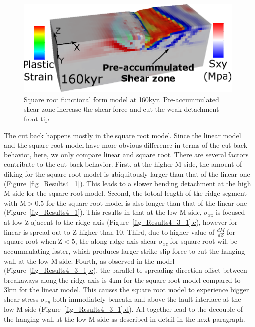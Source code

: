 \begin{figure}[hc]
  \centering
    \includegraphics[width=1.0\textwidth]{fig_Results4_5_sqrt_cut_back_pre_accummulated_shear_zone.eps}
  \caption{Square root functional form model at 160kyr. Pre-accummulated shear zone increase the shear force and cut the weak detachment front tip}
 \label{fig_Results4_5}
\end{figure}   

The cut back happens mostly in the square root model. Since the linear model and the square root model have more obvious difference in terms of the cut back behavior, here, we only compare linear and square root. There are several factors contribute to the cut back behavior. First, at the higher M side, the amount of diking for the square root model is ubiquitously larger than that of the linear one (Figure~\hyperref[fig_Results4_1]{\ref{fig_Results4_1}}). This leads to a slower bending detachment at the high M side for the square root model. Second, the totoal length of the ridge segment with M$>0.5$ for the square root model is also longer than that of the linear one (Figure~\hyperref[fig_Results4_1]{\ref{fig_Results4_1}}). This results in that at the low M side, $\sigma_{xz}$ is focused at low Z ajacent to the ridge-axis (Figure~\hyperref[fig_Results4_3_1]{\ref{fig_Results4_3_1}.e}), however for linear is spread out to Z higher than 10. Third, due to higher value of $\frac{dM}{dZ}$ for square root when Z$<5$, the along ridge-axis shear $\sigma_{xz}$ for square root will be accummulating faster, which produces larger strike-slip force to cut the hanging wall at the low M side. Fourth, as observed in the model (Figure~\hyperref[fig_Results4_3_1]{\ref{fig_Results4_3_1}.c}), the parallel to spreading direction offset between breakaways along the ridge-axis is 4km for the square root model compared to 3km for the linear model. This causes the square root model to experience bigger shear stress $\sigma_{xy}$ both immediately beneath and above the fault interface at the low M side (Figure~\hyperref[fig_Results4_3_1]{\ref{fig_Results4_3_1}.d}). All together lead to the decouple of the hanging wall at the low M side as described in detail in the next paragraph.

